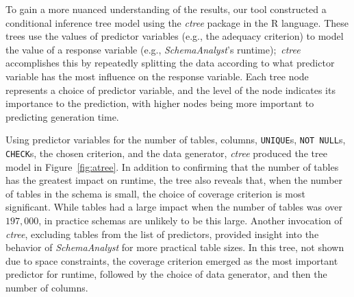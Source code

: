 
To gain a more nuanced understanding of the results, our tool constructed a conditional inference tree model using the
\textit{ctree} package in the R language. These trees use the values of predictor variables (e.g., the adequacy
criterion) to model the value of a response variable (e.g., {\em SchemaAnalyst}'s runtime);~\textit{ctree} accomplishes this
by repeatedly splitting the data according to what predictor variable has the most influence on the response variable.
Each tree node represents a choice of predictor variable, and the level of the node indicates its importance to
the prediction, with higher nodes being more important to predicting generation time.



Using predictor variables for the number of tables, columns, {\tt UNIQUE}s, {\tt NOT NULL}s, {\tt CHECK}s, the chosen
criterion, and the data generator, \textit{ctree} produced the tree model in Figure~\ref{fig:atree}.  In addition to
confirming that the number of tables has the greatest impact on runtime, the tree also reveals that, when the number of
tables in the schema is small, the choice of coverage criterion is most significant.  While tables had a large impact
when the number of tables was over $197,000$, in practice schemas are unlikely to be this large. Another invocation of
\textit{ctree}, excluding tables from the list of predictors, provided insight into the behavior of
\textit{SchemaAnalyst} for more practical table sizes. In this tree, not shown due to space constraints, the coverage
criterion emerged as the most important predictor for runtime, followed by the choice of data generator, and then the
number of columns.
